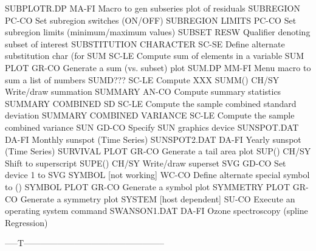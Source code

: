 SUBPLOTR.DP                 MA-FI Macro to gen subseries plot of residuals
SUBREGION                   PC-CO Set subregion switches (ON/OFF)
SUBREGION LIMITS            PC-CO Set subregion limits (minimum/maximum values)
SUBSET                      RESW  Qualifier denoting subset of interest
SUBSTITUTION CHARACTER      SC-SE Define alternate substitution char (for \)
SUM                         SC-LE Compute sum of elements in a variable
SUM PLOT                    GR-CO Generate a sum (vs. subset) plot
SUM.DP                      MM-FI Menu macro to sum a list of numbers
SUMD???                     SC-LE Compute XXX
SUMM()                      CH/SY Write/draw summation
SUMMARY                     AN-CO Compute summary statistics
SUMMARY COMBINED SD         SC-LE Compute the sample combined standard deviation
SUMMARY COMBINED VARIANCE   SC-LE Compute the sample combined variance
SUN                         GD-CO Specify SUN graphics device
SUNSPOT.DAT                 DA-FI Monthly sunspot (Time Series)
SUNSPOT2.DAT                DA-FI Yearly sunspot (Time Series)
SURVIVAL PLOT               GR-CO Generate a tail area plot
SUP()                       CH/SY Shift to superscript
SUPE()                      CH/SY Write/draw superset
SVG                         GD-CO Set device 1 to SVG
SYMBOL [not working]        WC-CO Define alternate special symbol to ()
SYMBOL PLOT                 GR-CO Generate a symbol plot
SYMMETRY PLOT               GR-CO Generate a symmetry plot
SYSTEM [host dependent]     SU-CO Execute an operating system command
SWANSON1.DAT                DA-FI Ozone spectroscopy (spline Regression)

-----T--------------------------------------------------

